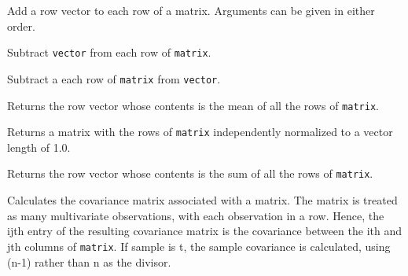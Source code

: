 \begin{description}
\item{}
Add a row vector to each row of a matrix.
Arguments can be given in either order.

\item{}

\item{}

\item{}

\item{}
Subtract {\tt vector} from each row of {\tt matrix}.

\item{}
Subtract a each row of {\tt matrix} from {\tt vector}.

\item{}

\item{}

\item{}
Returns the row vector whose contents is the mean of all the rows
of {\tt matrix}.

\item{}

\item{}
Returns a matrix with the rows of {\tt matrix} independently
normalized to a vector length of 1.0.

\item{}

\item{}
Returns the row vector whose contents is the sum of all the rows
of {\tt matrix}.

\item{}

\item{}
Calculates the covariance matrix associated with a matrix.  The matrix
is treated as many multivariate observations, with each observation in
a row.  Hence, the ijth entry of the resulting covariance matrix is
the covariance between the ith and jth columns of {\tt matrix}.
If sample is t, the sample covariance is calculated,
using (n-1) rather than n as the divisor.


\end{description}

